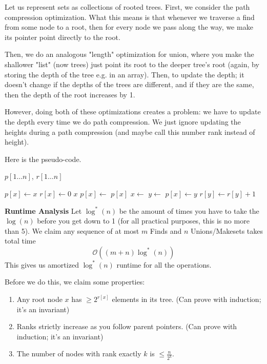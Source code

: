 \begin{algothm}
    Let us represent sets as collections of rooted trees.
    First, we consider the path compression optimization. What this means is that whenever we traverse a find from some node to a root,
    then for every node we pass along the way, we make its pointer point directly to the root.
    
    Then, we do an analogous "length" optimization
    for union, where you make the shallower "list" (now trees) just point its root to the deeper tree's root (again, by storing the depth of the tree e.g.
    in an array). Then, to update the depth; it doesn't change if the depths of the trees are different, and if they are the same,
    then the depth of the root increases by 1.

    However, doing both of these optimizations creates a problem: we have to update the depth every time we do path compression.
    We just ignore updating the heights during a path compression (and maybe call this number rank instead of height).

    Here is the pseudo-code.

    $p[1\dots n]$, $r[1 \dots n]$ 
    \begin{algorithmic}
            \State $p[x] \gets x$
            \State $r[x] \gets 0$
        \EndFunction
            \State \Return $x$
            \EndIf
            \State $p[x] \gets$ 
            \Return $p[x]$
        \EndFunction
            \State $x \gets$ 
            \State $y \gets$ 
                \State \Return
            \EndIf
                \State {}
            \EndIf
            \State $p[x] \gets y$
                \State $r[y] \gets r[y] + 1$
            \EndIf
        \EndFunction
    \end{algorithmic}

    \textbf{Runtime Analysis} Let $\log^*(n)$ be the amount of times you have to take
    the $\log(n)$ before you get down to 1 (for all practical purposes, this is no more than 5).
    We claim any sequence of at most $m$ Finds and $n$ Unions/Makesets takes total time
    \[ \mathcal{O}((m + n) \log^*(n)) \]
    This gives us amortized $\log^*(n)$ runtime for all the operations.

    Before we do this, we claim some properties:
    \begin{enumerate}
        \item Any root node $x$ has $\geq 2^{r[x]}$ elements in its tree. (Can prove with induction; it's an invariant)
        \item Ranks strictly increase as you follow parent pointers. (Can prove with induction; it's an invariant)
        \item The number of nodes with rank exactly $k$ is $\leq \frac{n}{2^k}$. 
    \end{enumerate}


\end{algothm}
